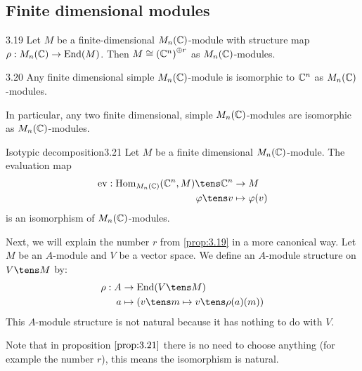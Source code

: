 \documentclass[twoside = false,	%
		headsepline,		%
		parskip = true,
		]{scrbook}						%
\begin{document}
    \subsection{Finite dimensional modules}

    \begin{proposition}{}{3.19}
        Let $M$ be a finite-dimensional $M_n(\mathbb C)$-module with structure map $\rho: M_n(\mathbb C) \to \mathrm{End}(M)$. Then $M \cong \left( \mathbb C^n\right)^{\oplus r}$ as $M_n(\mathbb C)$-modules.
    \end{proposition}
    
    \begin{corollary}{}{3.20}
        Any finite dimensional simple $M_n(\mathbb C)$-module is isomorphic to $\mathbb C^n$ as $M_n(\mathbb C)$-modules.
    \end{corollary}
    
    In particular, any two finite dimensional, simple $M_n(\mathbb C)$-modules are isomorphic as $M_n(\mathbb C)$-modules.
    
    \begin{proposition}{Isotypic decomposition}{3.21}
        Let $M$ be a finite dimensional $M_n(\mathbb C)$-module. The evaluation map
        \begin{equation*}
        \begin{split}
            \ev: \Hom_{M_n(\C)}(\C^n,M) \tens \C^n &\to M \\
            \varphi \tens v &\mapsto \varphi(v)
        \end{split}
        \end{equation*}
        is an isomorphism of $M_n(\mathbb C)$-modules.
    \end{proposition}
    
    Next, we will explain the number $r$ from \ref{prop:3.19} in a more canonical way.
    Let $M$ be an $A$-module and $V$ be a vector space. We define an $A$-module structure on $V \tens M$ by:
    \begin{equation*}
    \begin{split}
        \rho: A &\to \End(V \tens M)\\
            a &\mapsto \round{v \tens m \mapsto v \tens \rho(a)(m)}
    \end{split}
    \end{equation*}
    This $A$-module structure is not natural because it has nothing to do with $V$.

    Note that in proposition $\ref{prop:3.21}$ there is no need to choose anything (for example the number $r$), this means the isomorphism is natural.
\end{document}
